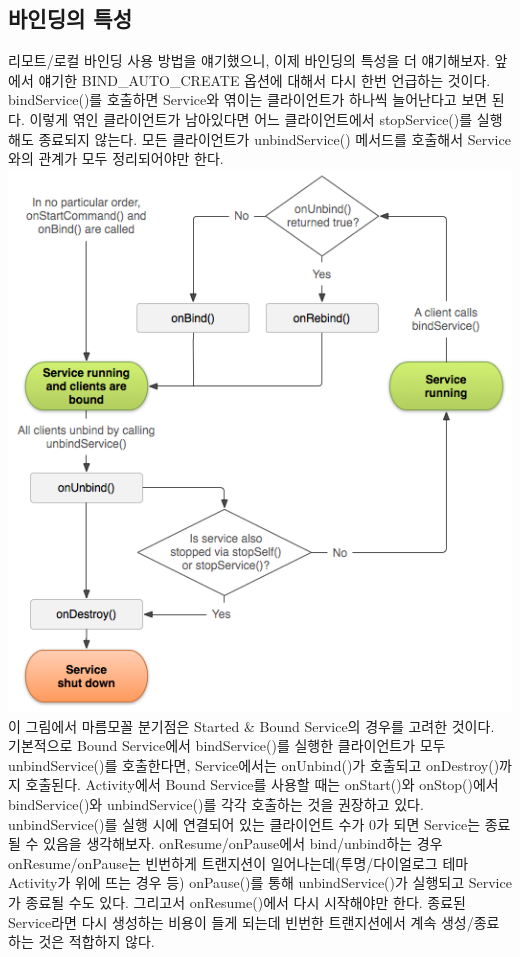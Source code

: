\subsection{바인딩의 특성}
\label{subsec:binding_special}
리모트/로컬 바인딩 사용 방법을 얘기했으니, 이제 바인딩의 특성을 더 얘기해보자. 앞에서 얘기한 BIND\_AUTO\_CREATE 옵션에 대해서 다시 한번 언급하는 것이다. 
bindService()를 호출하면 Service와 엮이는 클라이언트가 하나씩 늘어난다고 보면 된다. 
이렇게 엮인 클라이언트가 남아있다면 어느 클라이언트에서 stopService()를 실행해도 종료되지 않는다. 모든 클라이언트가 unbindService() 메서드를 호출해서 Service와의 관계가 모두 정리되어야만 한다.\\
\includegraphics[scale=0.5]{service-binding-tree-lifecycle}\\
이 그림에서 마름모꼴 분기점은 Started \& Bound Service의 경우를 고려한 것이다.\\

기본적으로 Bound Service에서 bindService()를 실행한 클라이언트가 모두 unbindService()를 호출한다면, Service에서는 onUnbind()가 호출되고 onDestroy()까지 호출된다.
Activity에서 Bound Service를 사용할 때는 onStart()와 onStop()에서 bindService()와 unbindService()를 각각 호출하는 것을 권장하고 있다. unbindService()를 실행 시에 연결되어 있는 클라이언트 수가 0가 되면 Service는 종료될 수 있음을 생각해보자. onResume/onPause에서 bind/unbind하는 경우 onResume/onPause는 빈번하게 트랜지션이 일어나는데(투명/다이얼로그 테마 Activity가 위에 뜨는 경우 등) onPause()를 통해 unbindService()가 실행되고 Service가 종료될 수도 있다. 
그리고서 onResume()에서 다시 시작해야만 한다. 종료된 Service라면 다시 생성하는 비용이 들게 되는데 빈번한 트랜지션에서 계속 생성/종료하는 것은 적합하지 않다.\\

